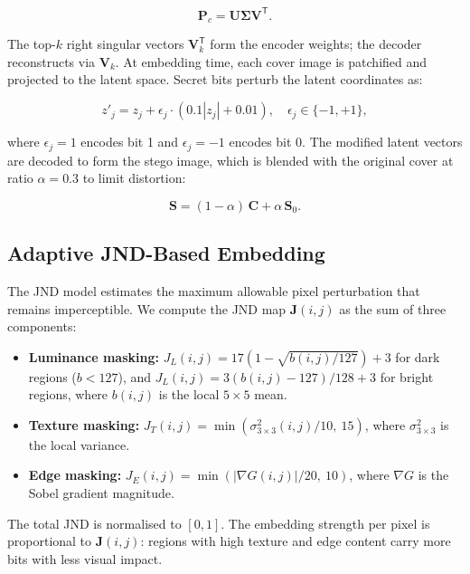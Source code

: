 \documentclass[conference]{IEEEtran}
\begin{document}
\begin{equation}
\mathbf{P}_c = \mathbf{U} \boldsymbol{\Sigma} \mathbf{V}^\mathsf{T}.
\label{eq:svd}
\end{equation}

The top-$k$ right singular vectors $\mathbf{V}_k^\mathsf{T}$ form the encoder weights; the decoder reconstructs via $\mathbf{V}_k$. At embedding time, each cover image is patchified and projected to the latent space. Secret bits perturb the latent coordinates as:

\begin{equation}
z'_j = z_j + \epsilon_j \cdot (0.1|z_j| + 0.01), \quad \epsilon_j \in \{-1, +1\},
\label{eq:gan_mod}
\end{equation}

where $\epsilon_j = 1$ encodes bit 1 and $\epsilon_j = -1$ encodes bit 0. The modified latent vectors are decoded to form the stego image, which is blended with the original cover at ratio $\alpha = 0.3$ to limit distortion:

\begin{equation}
\mathbf{S} = (1-\alpha)\,\mathbf{C} + \alpha\,\mathbf{S}_0.
\label{eq:blend}
\end{equation}

\subsection{Adaptive JND-Based Embedding}

The JND model estimates the maximum allowable pixel perturbation that remains imperceptible. We compute the JND map $\mathbf{J}(i,j)$ as the sum of three components:

\begin{itemize}
    \item \textbf{Luminance masking:} $J_L(i,j) = 17(1-\sqrt{b(i,j)/127}) + 3$ for dark regions ($b < 127$), and $J_L(i,j) = 3(b(i,j)-127)/128 + 3$ for bright regions, where $b(i,j)$ is the local $5\times5$ mean.
    \item \textbf{Texture masking:} $J_T(i,j) = \min(\sigma^2_{3\times3}(i,j) / 10,\ 15)$, where $\sigma^2_{3\times3}$ is the local variance.
    \item \textbf{Edge masking:} $J_E(i,j) = \min(|\nabla G(i,j)| / 20,\ 10)$, where $\nabla G$ is the Sobel gradient magnitude.
\end{itemize}

The total JND is normalised to $[0,1]$. The embedding strength per pixel is proportional to $\mathbf{J}(i,j)$: regions with high texture and edge content carry more bits with less visual impact.
\end{document}
